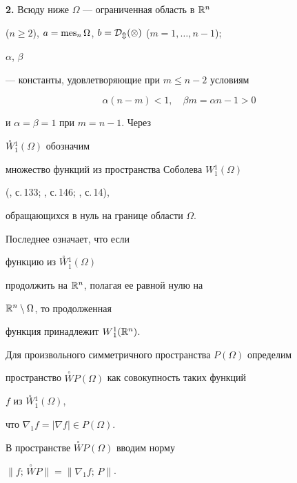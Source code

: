  


{\bf 2.} Всюду ниже $\Omega$ --- ограниченная область в $\Bbb R^n$ 


($n\ge 2$), $a=\operatorname{mes}_n\Omega$, $b=\cal D_m(\Omega)$ ($m=1,\dotsc,n-1$); 


$\alpha$, $\beta$ 


--- константы, удовлетворяющие при $m\le n-2$ условиям 


\begin{equation} 




\alpha(n-m)<1, \quad \beta m=\alpha n-1>0 


\end{equation} 


и $\alpha=\beta=1$ при $m=n-1$. Через 


$\overset{\circ}{W}{}^1_1(\Omega)$ обозначим 


множество функций из пространства Соболева $W{}^1_1(\Omega)$ 


(\cite{Sob}, с.\,133; \cite{Sol}, с.\,146; \cite{Maz}, с.\,14), 


обращающихся в нуль на границе области $\Omega$. 


Последнее означает, что если 


функцию из $\overset{\circ}{W}{}^1_1(\Omega)$ 


продолжить на $\Bbb R^n$, полагая ее равной нулю на 


$\Bbb R^n\setminus\Omega$, то продолженная 


функция принадлежит $W{}^1_1(\Bbb R^n)$. 


 


Для произвольного симметричного пространства $P(\Omega)$ определим 


пространство $\overset{\circ}{W}P(\Omega)$ как совокупность таких функций 


$f$ из $\overset{\circ}{W}{}^1_1(\Omega)$, 


что $\nabla_1 f=|\nabla f|\in P(\Omega)$. 


В пространстве $\overset{\circ}{W}P(\Omega)$ вводим норму 


$\|f;\,\overset{\circ}{W}P\|=\|\nabla_1f;\,P\|$. 


 




